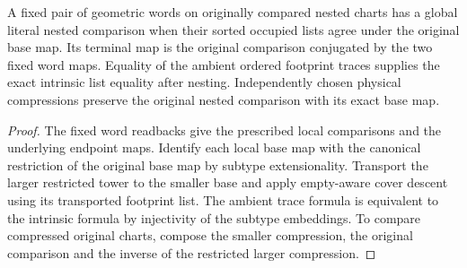 \begin{theorem}
\label{hir:g8-global-fixed-sorted-pair}
\leanok
A fixed pair of geometric words on originally compared nested
charts has a global literal nested comparison when their sorted
occupied lists agree under the original base map. Its terminal
map is the original comparison conjugated by the two fixed
word maps. Equality of the ambient ordered footprint traces
supplies the exact intrinsic list equality after nesting.
Independently chosen physical compressions preserve the
original nested comparison with its exact base map.
\end{theorem}
\begin{proof}
The fixed word readbacks give the prescribed local comparisons
and the underlying endpoint maps. Identify each local base map
with the canonical restriction of the original base map by
subtype extensionality. Transport the larger restricted tower
to the smaller base and apply empty-aware cover descent using
its transported footprint list. The ambient trace formula is
equivalent to the intrinsic formula by injectivity of the
subtype embeddings. To compare compressed original charts,
compose the smaller compression, the original comparison
and the inverse of the restricted larger compression.
\end{proof}

